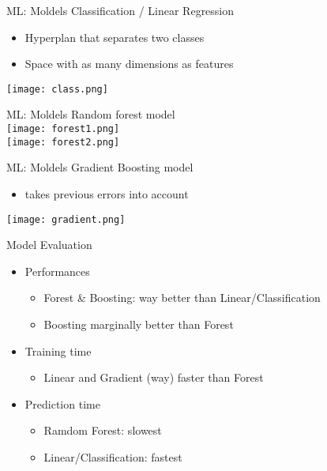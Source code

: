 \begin{frame}{ML: Moldels }
  Classification / Linear Regression
  \begin{itemize}
    \item Hyperplan that separates two classes
    \item Space with as many dimensions as features
  \end{itemize}
\texttt{[image: class.png]}
\end{frame}

\begin{frame}{ML: Moldels }
  Random forest model\\
\texttt{[image: forest1.png]}\\
\texttt{[image: forest2.png]}
\end{frame}

\begin{frame}{ML: Moldels }
  Gradient Boosting model
  \begin{itemize}
    \item takes previous errors into account
  \end{itemize}
\texttt{[image: gradient.png]}
\end{frame}

\begin{frame}{Model Evaluation}
  \begin{itemize}
    \item Performances
    \begin{itemize}
      \item Forest \& Boosting: way better than Linear/Classification
      \item Boosting marginally better than Forest
    \end{itemize}
    \item Training time
    \begin{itemize}
        \item Linear and Gradient (way) faster than Forest
    \end{itemize}
    \item Prediction time
    \begin{itemize}
        \item Ramdom Forest: slowest
        \item Linear/Classification: fastest
    \end{itemize}
  \end{itemize}
\end{frame}


